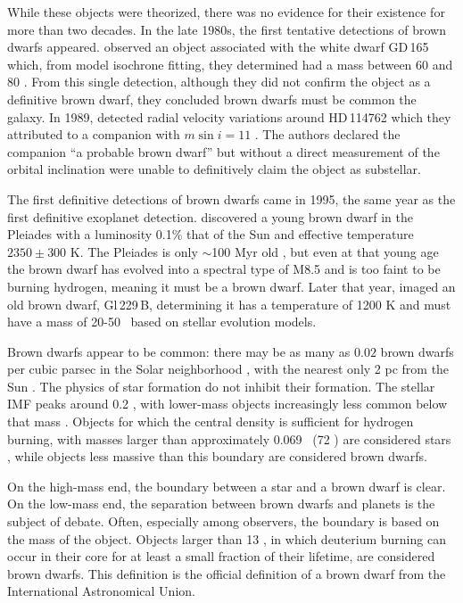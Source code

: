 While these objects were theorized, there was no evidence for their existence for more than two decades.
In the late 1980s, the first tentative detections of brown dwarfs appeared.
\citet{Becklin88} observed an object associated with the white dwarf GD\,165 which, from model isochrone
fitting, they determined had a mass between 60 and 80 \mjup.
From this single detection, although they did not confirm the object as a definitive brown dwarf,
they concluded brown dwarfs must be common the galaxy.
In 1989, \citet{Latham89} detected radial velocity variations around HD\,114762 which they attributed to
a companion with $m \sin i = 11$ \mjup. 
The authors declared the companion ``a probable brown dwarf'' but without a direct measurement of the
orbital inclination were unable to definitively claim the object as substellar.

The first definitive detections of brown dwarfs came in 1995, the same year as the first definitive exoplanet
detection.
\citet{Rebolo95} discovered a young brown dwarf in the Pleiades with a luminosity 0.1\% that of the Sun
and effective temperature $2350 \pm 300$ K.
The Pleiades is only $\sim$100 Myr old \citep{Basri96}, but even at that young age the brown dwarf has
evolved into a spectral type of M8.5 and is too faint to be burning hydrogen, meaning it must be
a brown dwarf.
Later that year, \citet{Nakajima95} imaged an old brown dwarf, Gl\,229\,B, determining it has a temperature
of 1200 K and must have a mass of 20-50 \mjup\ based on stellar evolution models.


Brown dwarfs appear to be common: there may be as many as $0.02$ brown dwarfs per
cubic parsec in the Solar neighborhood \citep{Reyle10},
with the nearest only 2 pc from the Sun \citep{Luhman14}.
The physics of star formation do not inhibit their formation.
The stellar IMF peaks around 0.2 \msun, with lower-mass objects increasingly less common
below that mass \citep{Chabrier03}.
Objects for which the central density is sufficient for hydrogen burning, with masses larger than approximately 
0.069 \msun\ (72 \mjup) are considered stars \citep{Zuckerman00}, while objects less massive than this
boundary are considered brown dwarfs.


On the high-mass end, the boundary between a star and a brown dwarf is clear.
On the low-mass end, the separation between brown dwarfs and planets is 
the subject of debate.
Often, especially among observers, the boundary is based on the mass of the object.
Objects larger than 13 \mjup, in which deuterium burning can occur in their core for
at least a small fraction of their lifetime, are considered brown dwarfs.
This definition is the official definition of a brown dwarf from the International
Astronomical Union.

